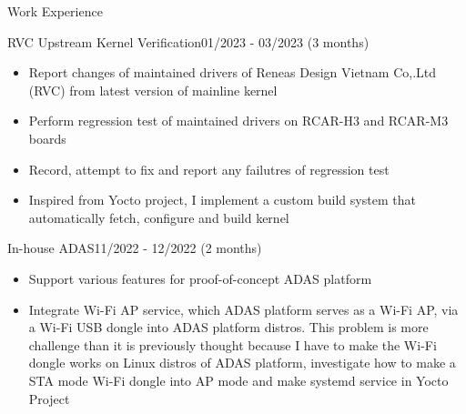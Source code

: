 \documentclass{resume} %
\begin{document}
\begin{rSection}{Work Experience}
\begin{rCompanySubsection}
        \begin{rProjectSubsubsectionV2}{RVC Upstream Kernel Verification}{01/2023 - 03/2023 (3 months)} {
            \begin{itemize}
                \item Report changes of maintained drivers of Reneas Design Vietnam Co,.Ltd (RVC) from latest version of mainline kernel
                \item Perform regression test of maintained drivers on RCAR-H3 and RCAR-M3 boards
                \item Record, attempt to fix and report any failutres of regression test
            \end{itemize}
        }{
            \begin{itemize}
                \item Inspired from Yocto project, I implement a custom build system that automatically fetch, configure and build kernel
            \end{itemize}
        }
        \end{rProjectSubsubsectionV2}

        \begin{rProjectSubsubsectionV2}{In-house ADAS}{11/2022 - 12/2022 (2 months)} {
            \begin{itemize}
                \item Support various features for proof-of-concept ADAS platform
            \end{itemize}
        }{
            \begin{itemize}
                \item Integrate Wi-Fi AP service, which ADAS platform serves as a Wi-Fi AP, via a Wi-Fi USB dongle into ADAS platform distros. This problem is more challenge than it is previously thought because I have to make the Wi-Fi dongle works on Linux distros of ADAS platform, investigate how to make a STA mode Wi-Fi dongle into AP mode and make systemd service in Yocto Project
            \end{itemize}
        }
        \end{rProjectSubsubsectionV2}


\end{rCompanySubsection}
\end{rSection}
\end{document}
